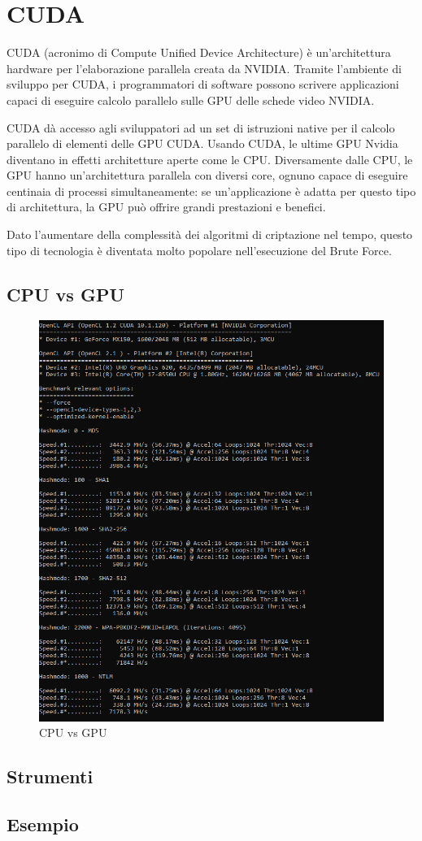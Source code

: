 \chapter{CUDA}

CUDA (acronimo di Compute Unified Device Architecture) è un'architettura hardware per l'elaborazione parallela creata da NVIDIA. Tramite l'ambiente di sviluppo per CUDA, i programmatori di software possono scrivere applicazioni capaci di eseguire calcolo parallelo sulle GPU delle schede video NVIDIA.

CUDA dà accesso agli sviluppatori ad un set di istruzioni native per il calcolo parallelo di elementi delle GPU CUDA. Usando CUDA, le ultime GPU Nvidia diventano in effetti architetture aperte come le CPU. Diversamente dalle CPU, le GPU hanno un'architettura parallela con diversi core, ognuno capace di eseguire centinaia di processi simultaneamente: se un'applicazione è adatta per questo tipo di architettura, la GPU può offrire grandi prestazioni e benefici.

Dato l'aumentare della complessità dei algoritmi di criptazione nel tempo, questo tipo di tecnologia è diventata molto popolare nell'esecuzione del Brute Force. 

\section{CPU vs GPU}

\begin{figure}[ht]
    \centering
    \includegraphics[width=\linewidth]{Immagini/7/cpu_gpu.PNG}
    \caption{CPU vs GPU}
    \label{fig:CPU vs GPU}
\end{figure}

\section{Strumenti}
\section{Esempio}
\label{chap:conc}